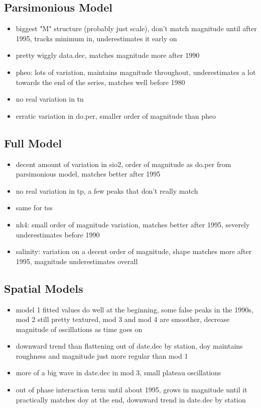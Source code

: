 \documentclass[12pt]{amsart}
\begin{document}
\subsection{Parsimonious Model}
\begin{itemize}
\item biggest "M" structure (probably just scale), don't match magnitude until after 1995, tracks minimum in, underestimates it early on
\item pretty wiggly data.dec, matches magnitude more after 1990
\item pheo: lots of variation, maintains magnitude throughout, underestimates a lot towards the end of the series, matches well before 1980
\item no real variation in tn
\item erratic variation in do.per, smaller order of magnitude than pheo
\end{itemize}

\subsection{Full Model}
\begin{itemize}
\item decent amount of variation in sio2, order of magnitude as do.per from parsimonious model, matches better after 1995
\item no real variation in tp, a few peaks that don't really match
\item same for tss
\item nh4: small order of magnitude variation, matches better after 1995, severely underestimates before 1990
\item salinity: variation on a decent order of magnitude, shape matches more after 1995, magnitude underestimates overall
\end{itemize}

\subsection{Spatial Models}

\begin{itemize}
\item model 1 fitted values do well at the beginning, some false peaks in the 1990s, mod 2 still pretty textured, mod 3 and mod 4 are smoother, decrease magnitude of oscillations as time goes on
\item downward trend than flattening out of date.dec by station, doy maintains roughness and magnitude just more regular than mod 1
\item more of a big wave in date.dec in mod 3, small plateau oscillations
\item out of phase interaction term until about 1995, grows in magnitude until it practically matches doy at the end, downward trend in date.dec by station
\end{itemize}
\end{document}
